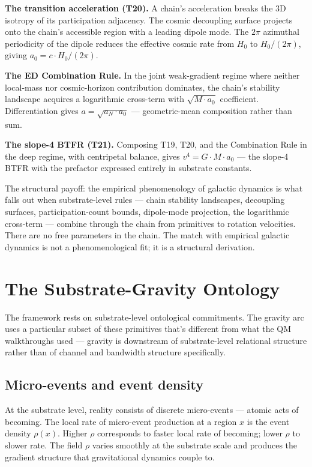 \documentclass[11pt,a4paper]{article}
\begin{document}
\textbf{The transition acceleration (T20).} A chain's acceleration breaks the 3D isotropy of its participation adjacency. The cosmic decoupling surface projects onto the chain's accessible region with a leading dipole mode. The $2\pi$ azimuthal periodicity of the dipole reduces the effective cosmic rate from $H_0$ to $H_0/(2\pi)$, giving $a_0 = c\cdot H_0/(2\pi)$.

\textbf{The ED Combination Rule.} In the joint weak-gradient regime where neither local-mass nor cosmic-horizon contribution dominates, the chain's stability landscape acquires a logarithmic cross-term with $\sqrt{M\cdot a_0}$ coefficient. Differentiation gives $a = \sqrt{a_N \cdot a_0}$ --- geometric-mean composition rather than sum.

\textbf{The slope-4 BTFR (T21).} Composing T19, T20, and the Combination Rule in the deep regime, with centripetal balance, gives $v^4 = G\cdot M\cdot a_0$ --- the slope-4 BTFR with the prefactor expressed entirely in substrate constants.

The structural payoff: the empirical phenomenology of galactic dynamics is what falls out when substrate-level rules --- chain stability landscapes, decoupling surfaces, participation-count bounds, dipole-mode projection, the logarithmic cross-term --- combine through the chain from primitives to rotation velocities. There are no free parameters in the chain. The match with empirical galactic dynamics is not a phenomenological fit; it is a structural derivation.

\section{The Substrate-Gravity Ontology}

The framework rests on substrate-level ontological commitments. The gravity arc uses a particular subset of these primitives that's different from what the QM walkthroughs used --- gravity is downstream of substrate-level relational structure rather than of channel and bandwidth structure specifically.

\subsection{Micro-events and event density}

At the substrate level, reality consists of discrete micro-events --- atomic acts of becoming. The local rate of micro-event production at a region $x$ is the event density $\rho(x)$. Higher $\rho$ corresponds to faster local rate of becoming; lower $\rho$ to slower rate. The field $\rho$ varies smoothly at the substrate scale and produces the gradient structure that gravitational dynamics couple to.
\end{document}
